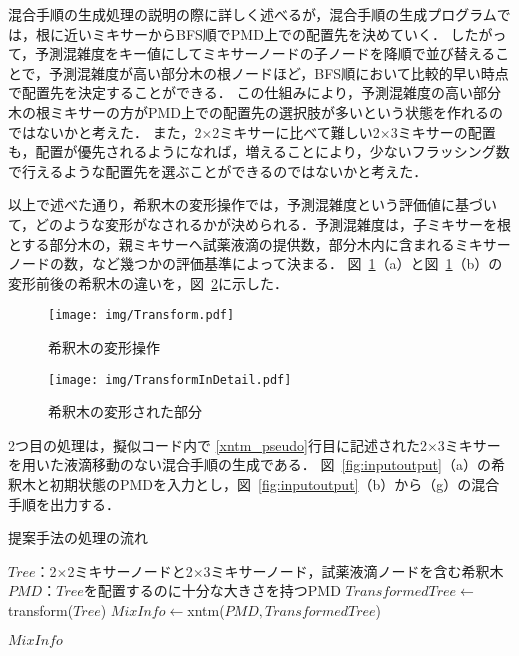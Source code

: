 混合手順の生成処理の説明の際に詳しく述べるが，混合手順の生成プログラムでは，根に近いミキサーからBFS順でPMD上での配置先を決めていく．
したがって，予測混雑度をキー値にしてミキサーノードの子ノードを降順で並び替えることで，予測混雑度が高い部分木の根ノードほど，BFS順において比較的早い時点で配置先を決定することができる．
この仕組みにより，予測混雑度の高い部分木の根ミキサーの方がPMD上での配置先の選択肢が多いという状態を作れるのではないかと考えた．
また，2$\times$2ミキサーに比べて難しい2$\times$3ミキサーの配置も，配置が優先されるようになれば，増えることにより，少ないフラッシング数で行えるような配置先を選ぶことができるのではないかと考えた．

以上で述べた通り，希釈木の変形操作では，予測混雑度という評価値に基づいて，どのような変形がなされるかが決められる．予測混雑度は，子ミキサーを根とする部分木の，親ミキサーへ試薬液滴の提供数，部分木内に含まれるミキサーノードの数，など幾つかの評価基準によって決まる．
図~\ref{fig:Transform}（a）と図~\ref{fig:Transform}（b）の変形前後の希釈木の違いを，図~\ref{fig:TransDetail}に示した．

\begin{figure}[tbp]
 \centering\texttt{[image: img/Transform.pdf]}
 \caption{希釈木の変形操作}\label{fig:Transform}
\end{figure}
\begin{figure}[tbp]
 \centering\texttt{[image: img/TransformInDetail.pdf]}
 \caption{希釈木の変形された部分}\label{fig:TransDetail}
\end{figure}


2つ目の処理は，擬似コード内で
\ref{xntm_pseudo}行目に記述された2$\times$3ミキサーを用いた液滴移動のない混合手順の生成である．
図~\ref{fig:inputoutput}（a）の希釈木と初期状態のPMDを入力とし，図~\ref{fig:inputoutput}（b）から（g）の混合手順を出力する．

\begin{algorithm}[tbp]
 \caption{提案手法の処理の流れ}\label{alg:all}
 \begin{algorithmic}[1]
     \Require $\mathit{Tree}$：2$\times$2ミキサーノードと2$\times$3ミキサーノード，試薬液滴ノードを含む希釈木 
     \Require $\mathit{PMD}$：$\mathit{Tree}$を配置するのに十分な大きさを持つPMD  
     \State $\mathit{TransformedTree} \gets$ transform($Tree$) \label{transform_pseudo}
     \State $\mathit{MixInfo \gets}$xntm($\mathit{PMD,TransformedTree}$)  \label{xntm_pseudo}

      \Return $\mathit{MixInfo}$
 \end{algorithmic}
\end{algorithm}

